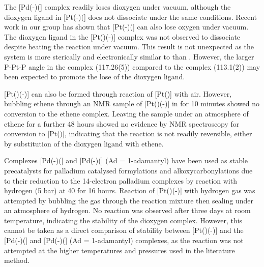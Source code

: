 The [Pd(-)(] complex readily loses dioxygen under vacuum, although the dioxygen ligand in [Pt(-)(] does not dissociate under the same conditions.\cite{Yoshida1979}  Recent work in our group has shown that [Pt(-)(] can also lose oxygen under vacuum.\cite{Kathrynthesis, Rosieunpublished}  The dioxygen ligand in the [Pt(\tButhixantphos)(-)] complex was not observed to dissociate despite heating the reaction under vacuum.  This result is not unexpected as the \tButhixantphos{} system is more sterically and electronically similar to  than .  However, the larger P-Pt-P angle in the \tButhixantphos{} complex (117.26(5)\degrees) compared to the  complex (113.1(2)\degrees) may been expected to promote the lose of the dioxygen ligand.\cite{Yoshida1979}  

[Pt(\tButhixantphos)(-)] can also be formed through reaction of [Pt(\tButhixantphos)] with air.  However, bubbling ethene through an NMR sample of [Pt(\tButhixantphos)(-)] in  for 10 minutes showed no conversion to the ethene complex.  Leaving the sample under an atmosphere of ethene for a further 48 hours showed no evidence by NMR spectroscopy for conversion to [Pt(\tButhixantphos)], indicating that the reaction is not readily reversible, either by substitution of the dioxygen ligand with ethene.  

Complexes [Pd(-)(] and [Pd(-)(] (Ad = 1-adamantyl) have been used as stable precatalysts for palladium catalysed formylations and alkoxycarbonylations due to their reduction to the 14-electron palladium complexes by reaction with hydrogen (5 bar) at 40\degC{} for 16 hours.\cite{Sergeev2010}  Reaction of [Pt(\tButhixantphos)(-)] with hydrogen gas was attempted by bubbling the gas through the reaction mixture then sealing under an atmosphere of hydrogen.  No reaction was observed after three days at room temperature, indicating the stability of the dioxygen complex.  However, this cannot be taken as a direct comparison of stability between [Pt(\tButhixantphos)(-)] and the [Pd(-)(] and [Pd(-)(] (Ad = 1-adamantyl) complexes, as the reaction was not attempted at the higher temperatures and pressures used in the literature method.\cite{Sergeev2010}

